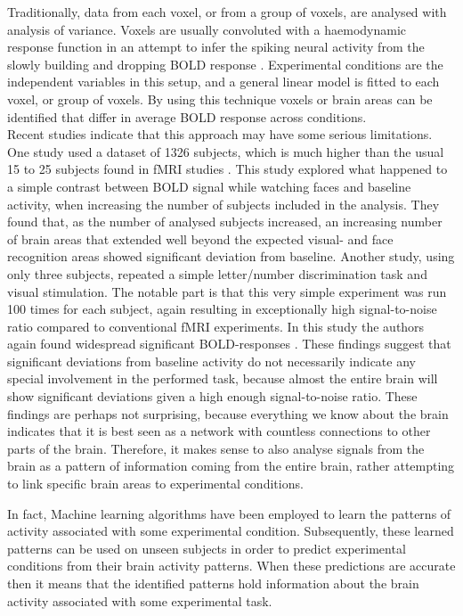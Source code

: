 \documentclass[preprint,journal,11pt]{vgtc}
\begin{document}
Traditionally, data from each voxel, or from a group of voxels, are analysed with analysis of variance. Voxels are usually convoluted with a haemodynamic response function in an attempt to infer the spiking neural activity from the slowly building and dropping BOLD response \cite{he:2002na}. Experimental conditions are the independent variables in this setup, and a general linear model is fitted to each voxel, or group of voxels. By using this technique voxels or brain areas can be identified that differ in average BOLD response across conditions.\\
\indent Recent studies indicate that this approach may have some serious limitations. One study used a dataset of 1326 subjects, which is much higher than the usual 15 to 25 subjects found in fMRI studies \cite{thy:2012very}. This study explored what happened to a simple contrast between BOLD signal while watching faces and baseline activity, when increasing the number of subjects included in the analysis. They found that, as the number of analysed subjects increased, an increasing number of brain areas that extended well beyond the expected visual- and face recognition areas showed significant deviation from baseline. Another study, using only three subjects, repeated a simple letter/number discrimination task and visual stimulation. The notable part is that this very simple experiment was run 100 times for each subject, again resulting in exceptionally high signal-to-noise ratio compared to conventional fMRI experiments. In this study the authors again found widespread significant BOLD-responses \cite{go:2012whole}. These findings suggest that significant deviations from baseline activity do not necessarily indicate any special involvement in the performed task, because almost the entire brain will show significant deviations given a high enough signal-to-noise ratio. These findings are perhaps not surprising, because everything we know about the brain indicates that it is best seen as a network with countless connections to other parts of the brain. Therefore, it makes sense to also analyse signals from the brain as a pattern of information coming from the entire brain, rather attempting to link specific brain areas to experimental conditions.

In fact, Machine learning algorithms have been employed to learn the patterns of activity associated with some experimental condition. Subsequently, these learned patterns can be used on unseen subjects in order to predict experimental conditions from their brain activity patterns. When these predictions are accurate then it means that the identified patterns hold information about the brain activity associated with some experimental task.
\end{document}
